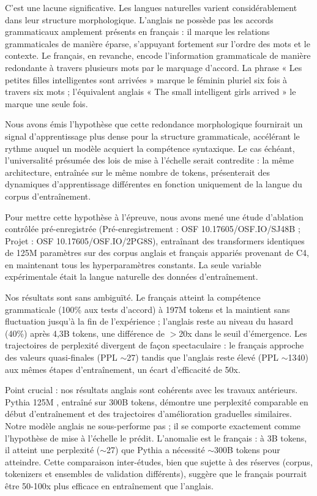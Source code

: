 \documentclass[11pt,a4paper]{article}
\begin{document}
C'est une lacune significative. Les langues naturelles varient considérablement dans leur structure morphologique. L'anglais ne possède pas les accords grammaticaux amplement présents en français : il marque les relations grammaticales de manière éparse, s'appuyant fortement sur l'ordre des mots et le contexte. Le français, en revanche, encode l'information grammaticale de manière redondante à travers plusieurs mots par le marquage d'accord. La phrase « Les petites filles intelligentes sont arrivées » marque le féminin pluriel six fois à travers six mots ; l'équivalent anglais « The small intelligent girls arrived » le marque une seule fois.

Nous avons émis l'hypothèse que cette redondance morphologique fournirait un signal d'apprentissage plus dense pour la structure grammaticale, accélérant le rythme auquel un modèle acquiert la compétence syntaxique. Le cas échéant, l'universalité présumée des lois de mise à l'échelle serait contredite : la même architecture, entraînée sur le même nombre de tokens, présenterait des dynamiques d'apprentissage différentes en fonction uniquement de la langue du corpus d'entraînement.

Pour mettre cette hypothèse à l'épreuve, nous avons mené une étude d'ablation contrôlée pré-enregistrée (Pré-enregistrement : OSF 10.17605/OSF.IO/SJ48B ; Projet : OSF 10.17605/OSF.IO/2PG8S), entraînant des transformers identiques de 125M paramètres sur des corpus anglais et français appariés provenant de C4, en maintenant tous les hyperparamètres constants. La seule variable expérimentale était la langue naturelle des données d'entraînement.

Nos résultats sont sans ambiguïté. Le français atteint la compétence grammaticale (100\% aux tests d'accord) à 197M tokens et la maintient sans fluctuation jusqu'à la fin de l'expérience ; l'anglais reste au niveau du hasard (40\%) après 4,3B tokens, une différence de $>$20x dans le seuil d'émergence. Les trajectoires de perplexité divergent de façon spectaculaire : le français approche des valeurs quasi-finales (PPL $\sim$27) tandis que l'anglais reste élevé (PPL $\sim$1340) aux mêmes étapes d'entraînement, un écart d'efficacité de 50x.

Point crucial : nos résultats anglais sont cohérents avec les travaux antérieurs. Pythia 125M \citep{biderman2023pythia}, entraîné sur 300B tokens, démontre une perplexité comparable en début d'entraînement et des trajectoires d'amélioration graduelles similaires. Notre modèle anglais ne sous-performe pas ; il se comporte exactement comme l'hypothèse de mise à l'échelle le prédit. L'anomalie est le français : à 3B tokens, il atteint une perplexité ($\sim$27) que Pythia a nécessité $\sim$300B tokens pour atteindre. Cette comparaison inter-études, bien que sujette à des réserves (corpus, tokenizers et ensembles de validation différents), suggère que le français pourrait être 50-100x plus efficace en entraînement que l'anglais.
\end{document}
